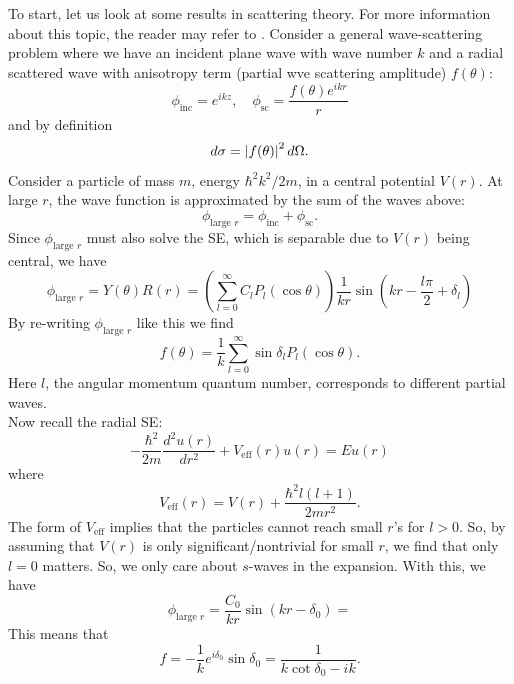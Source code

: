 \documentclass{book}
\theoremstyle{definition}
\newcommand{\f}[2]{\frac{#1}{#2}}
\newcommand{\lp}{\left(}
\newcommand{\rp}{\right)}
\begin{document}
To start, let us look at some results in scattering theory. For more information about this topic, the reader may refer to \cite{sakurai1995modern}. Consider a general wave-scattering problem where we have an incident plane wave with wave number $k$ and a radial scattered wave with anisotropy term (partial wve scattering amplitude) $f(\theta)$: 
\begin{equation*}
\phi_\text{inc} = e^{ikz}, \quad \phi_{\text{sc}} = \f{f(\theta)e^{ikr}}{r}
\end{equation*}
and by definition
\begin{equation*}
d\sigma = \abs{f(\theta)}^2\, d\Omega.
\end{equation*}
Consider a particle of mass $m$, energy $\hbar^2k^2/2m$, in a central potential $V(r)$. At large $r$, the wave function is approximated by the sum of the waves above:
\begin{equation*}
\phi_{\text{large } r} = \phi_{\text{inc}} + \phi_{\text{sc}}. 
\end{equation*}
Since $\phi_{\text{large } r}$ must also solve the SE, which is separable due to $V(r)$ being central, we have \cite{bohm2012quantum}
\begin{equation*}
\phi_{\text{large } r} = Y(\theta)R(r) = \lp \sum^\infty_{l=0} C_l P_l(\cos\theta) \rp \f{1}{kr}\sin\lp kr - \f{l\pi}{2} + \delta_l \rp
\end{equation*}
By re-writing $\phi_\text{large $r$}$ like this we find 
\begin{equation*}
f(\theta) = \f{1}{k}\sum^\infty_{l=0} \sin \delta_l P_l(\cos\theta).
\end{equation*}
Here $l$, the angular momentum quantum number, corresponds to different partial waves. \\

Now recall the radial SE:
\begin{equation*}
-\f{\hbar^2}{2m}\f{d^2 u(r)}{dr^2} + V_\text{eff}(r)u(r) = Eu(r)
\end{equation*} 
where
\begin{equation*}
V_\text{eff}(r) = V(r) + \f{\hbar^2l(l+1)}{2mr^2}.
\end{equation*}
The form of $V_\text{eff}$ implies that the particles cannot reach small $r$'s for $l>0$. So, by assuming that $V(r)$ is only significant/nontrivial for small $r$, we find that only $l=0$ matters. So, we only care about $s$-waves in the expansion. With this, we have
\begin{equation*}
\phi_{\text{large } r} = \f{C_0}{kr} \sin(kr - \delta_0) = 
\end{equation*}
This means that
\begin{equation*}
f = -\f{1}{k}e^{i\delta_0 }\sin\delta_0 = \f{1}{k\cot\delta_0 -ik}. 
\end{equation*}
\end{document}
